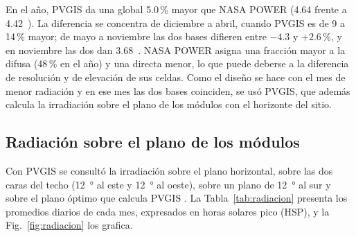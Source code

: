 En el año, PVGIS da una global 5.0\,\% mayor que NASA POWER (4.64 frente a 4.42~\kwhmd). La diferencia se concentra de diciembre a abril, cuando PVGIS es de 9 a 14\,\% mayor; de mayo a noviembre las dos bases difieren entre $-4.3$ y $+2.6$\,\%, y en noviembre las dos dan 3.68~\kwhmd. NASA POWER asigna una fracción mayor a la difusa (48\,\% en el año) y una directa menor, lo que puede deberse a la diferencia de resolución y de elevación de sus celdas. Como el diseño se hace con el mes de menor radiación y en ese mes las dos bases coinciden, se usó PVGIS, que además calcula la irradiación sobre el plano de los módulos con el horizonte del sitio.

\subsection{Radiación sobre el plano de los módulos}

Con PVGIS se consultó la irradiación sobre el plano horizontal, sobre las dos caras del techo (\SI{12}{\degree} al este y \SI{12}{\degree} al oeste), sobre un plano de \SI{12}{\degree} al sur y sobre el plano óptimo que calcula PVGIS \cite{pvgis}. La Tabla~\ref{tab:radiacion} presenta los promedios diarios de cada mes, expresados en horas solares pico (HSP), y la Fig.~\ref{fig:radiacion} los grafica.

